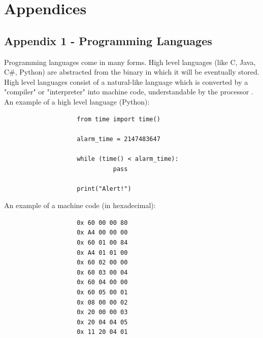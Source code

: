 \documentclass[a4]{report}
\def\achapter{preamble}
\begin{document}
	\newpage
	\def\achapter{Bibliography}
	
	



\appendix


\chapter*{Appendices}
\def\achapter{Appendices}
\setcounter{page}{1}
\setcounter{section}{1}
\section{Appendix 1 -  Programming Languages}
Programming languages come in many forms. High level languages (like C, Java, C\#, Python) are abstracted from the binary in which it will be eventually stored. High level languages consist of a natural-like language which is converted by a "compiler" or "interpreter" into machine code, understandable by the processor \cite{proglanghighlow}.\newline \newline  \noindent
\noindent
An example of a high level language (Python):
\begin{verbatim}
                    from time import time()

                    alarm_time = 2147483647

                    while (time() < alarm_time):
                              pass

                    print("Alert!")
\end{verbatim}
An example of a machine code (in hexadecimal)\cite{proglangmachex}:
\begin{verbatim}
                    0x 60 00 00 80
                    0x A4 00 00 00
                    0x 60 01 00 84
                    0x A4 01 01 00
                    0x 60 02 00 00
                    0x 60 03 00 04
                    0x 60 04 00 00
                    0x 60 05 00 01
                    0x 08 00 00 02
                    0x 20 00 00 03
                    0x 20 04 04 05
                    0x 11 20 04 01
\end{verbatim}
\end{document}
